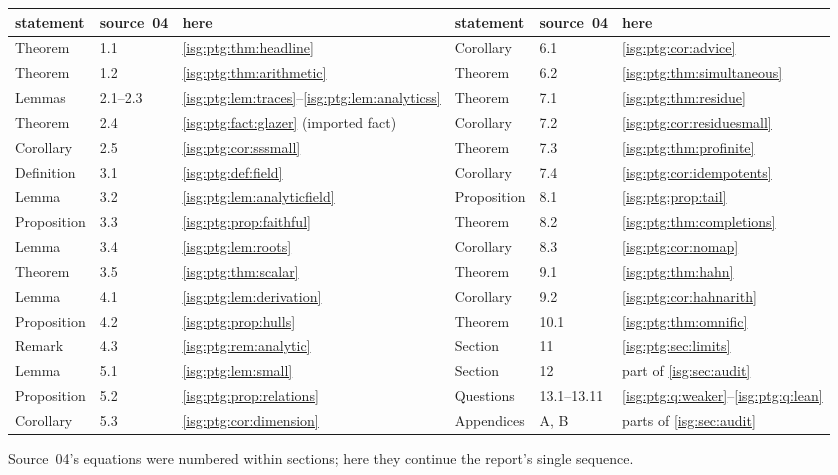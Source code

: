 \documentclass[11pt]{article}
\theoremstyle{definition}
\theoremstyle{remark}
\begin{document}
\begin{center}\small
\begin{tabular}{@{}lll@{\qquad}lll@{}}
\toprule
statement & source~04 & here & statement & source~04 & here\\
\midrule
Theorem & 1.1 & \ref{isg:ptg:thm:headline} & Corollary & 6.1 & \ref{isg:ptg:cor:advice}\\
Theorem & 1.2 & \ref{isg:ptg:thm:arithmetic} & Theorem & 6.2 & \ref{isg:ptg:thm:simultaneous}\\
Lemmas & 2.1--2.3 & \ref{isg:ptg:lem:traces}--\ref{isg:ptg:lem:analyticss} & Theorem & 7.1 & \ref{isg:ptg:thm:residue}\\
Theorem & 2.4 & \ref{isg:ptg:fact:glazer} (imported fact) & Corollary & 7.2 & \ref{isg:ptg:cor:residuesmall}\\
Corollary & 2.5 & \ref{isg:ptg:cor:sssmall} & Theorem & 7.3 & \ref{isg:ptg:thm:profinite}\\
Definition & 3.1 & \ref{isg:ptg:def:field} & Corollary & 7.4 & \ref{isg:ptg:cor:idempotents}\\
Lemma & 3.2 & \ref{isg:ptg:lem:analyticfield} & Proposition & 8.1 & \ref{isg:ptg:prop:tail}\\
Proposition & 3.3 & \ref{isg:ptg:prop:faithful} & Theorem & 8.2 & \ref{isg:ptg:thm:completions}\\
Lemma & 3.4 & \ref{isg:ptg:lem:roots} & Corollary & 8.3 & \ref{isg:ptg:cor:nomap}\\
Theorem & 3.5 & \ref{isg:ptg:thm:scalar} & Theorem & 9.1 & \ref{isg:ptg:thm:hahn}\\
Lemma & 4.1 & \ref{isg:ptg:lem:derivation} & Corollary & 9.2 & \ref{isg:ptg:cor:hahnarith}\\
Proposition & 4.2 & \ref{isg:ptg:prop:hulls} & Theorem & 10.1 & \ref{isg:ptg:thm:omnific}\\
Remark & 4.3 & \ref{isg:ptg:rem:analytic} & Section & 11 & \ref{isg:ptg:sec:limits}\\
Lemma & 5.1 & \ref{isg:ptg:lem:small} & Section & 12 & part of \ref{isg:sec:audit}\\
Proposition & 5.2 & \ref{isg:ptg:prop:relations} & Questions & 13.1--13.11 & \ref{isg:ptg:q:weaker}--\ref{isg:ptg:q:lean}\\
Corollary & 5.3 & \ref{isg:ptg:cor:dimension} & Appendices & A, B & parts of \ref{isg:sec:audit}\\
\bottomrule
\end{tabular}
\end{center}
Source~04's equations were numbered within sections; here they continue the
report's single sequence.
\end{document}
